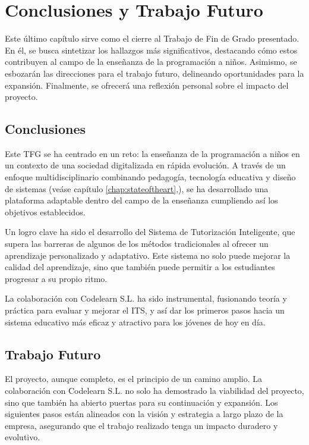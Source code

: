 \chapter{Conclusiones y Trabajo Futuro} \label{chap:conclusiones}

Este último capítulo sirve como el cierre al Trabajo de Fin de Grado presentado. En él, se busca sintetizar los hallazgos más significativos, destacando cómo estos contribuyen al campo de la enseñanza de la programación a niños. Asimismo, se esbozarán las direcciones para el trabajo futuro, delineando oportunidades para la expansión. Finalmente, se ofrecerá una reflexión personal sobre el impacto del proyecto.

\section{Conclusiones}

Este TFG se ha centrado en un reto: la enseñanza de la programación a niños en un contexto de una sociedad digitalizada en rápida evolución. A través de un enfoque multidisciplinario combinando pedagogía, tecnología educativa y diseño de sistemas (veáse capítulo \ref{chap:stateoftheart},), se ha desarrollado una plataforma adaptable dentro del campo de la enseñanza cumpliendo así los objetivos establecidos.

Un logro clave ha sido el desarrollo del Sistema de Tutorización Inteligente, que supera las barreras de algunos de los métodos tradicionales al ofrecer un aprendizaje personalizado y adaptativo. Este sistema no solo puede mejorar la calidad del aprendizaje, sino que también puede permitir a los estudiantes progresar a su propio ritmo.

La colaboración con Codelearn S.L. ha sido instrumental, fusionando teoría y práctica para evaluar y mejorar el ITS, y así dar los primeros pasos hacia un sistema educativo más eficaz y atractivo para los jóvenes de hoy en día.

\section{Trabajo Futuro}

El proyecto, aunque completo, es el principio de un camino amplio. La colaboración con Codelearn S.L. no solo ha demostrado la viabilidad del proyecto, sino que también ha abierto puertas para su continuación y expansión. Los siguientes pasos están alineados con la visión y estrategia a largo plazo de la empresa, asegurando que el trabajo realizado tenga un impacto duradero y evolutivo.

